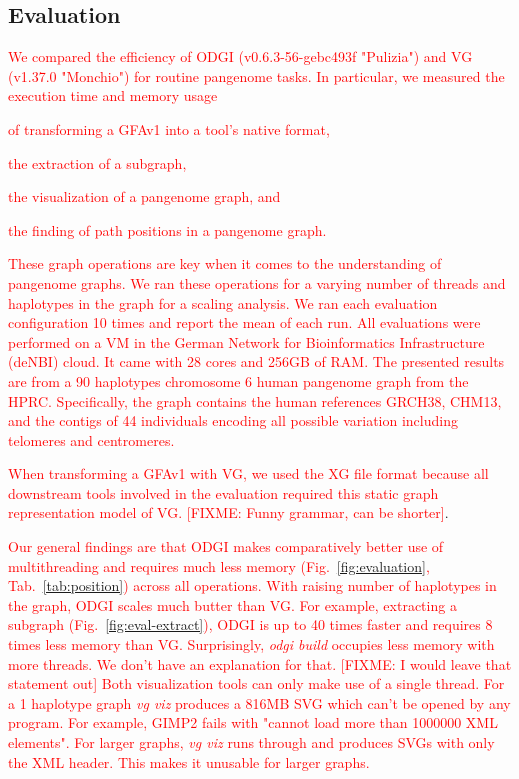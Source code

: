 \documentclass{bioinfo}
\newcommand{\red}[1]{{\textcolor{Red}{#1}}}
\newcommand{\FIXME}[1]{\red{[FIXME: #1]}}
\newcommand{\REVIEWED}[1]{{\textcolor{Red}{#1}}}
\begin{document}
\subsection{Evaluation}
\label{Evaluation}

\REVIEWED{We compared the efficiency of ODGI (v0.6.3-56-gebc493f "Pulizia") and VG (v1.37.0 "Monchio") for routine pangenome tasks. In particular, we measured the execution time and memory usage}
\begin{inparaenum}[(i)]
	\item \REVIEWED{of transforming a GFAv1 into a tool's native format, }
	\item \REVIEWED{the extraction of a subgraph,}
	\item \REVIEWED{the visualization of a pangenome graph, and}
	\item \REVIEWED{the finding of path positions in a pangenome graph.}
\end{inparaenum}
\REVIEWED{These graph operations are key when it comes to the understanding of pangenome graphs. We ran these operations for a varying number of threads and haplotypes in the graph for a scaling analysis. We ran each evaluation configuration 10 times and report the mean of each run.
All evaluations were performed on a VM in the German Network for Bioinformatics Infrastructure (deNBI) cloud. It came with 28 cores and 256GB of RAM.
The presented results are from a 90 haplotypes chromosome 6 human pangenome graph from the HPRC. Specifically, the graph contains the human references GRCH38, CHM13, and the contigs of 44 individuals encoding all possible variation including telomeres and centromeres. }

\REVIEWED{When transforming a GFAv1 with VG, we used the XG file format because all downstream tools involved in the evaluation required this static graph representation model of VG.} \FIXME{Funny grammar, can be shorter}.

\REVIEWED{Our general findings are that ODGI makes comparatively better use of multithreading and requires much less memory (Fig.~\ref{fig:evaluation}, Tab.~\ref{tab:position}) across all operations. With raising number of haplotypes in the graph, ODGI scales much butter than VG. For example, extracting a subgraph (Fig.~\ref{fig:eval-extract}), ODGI is up to 40 times faster and requires 8 times less memory than VG. Surprisingly, \textit{odgi build} occupies less memory with more threads. We don't have an explanation for that.
} \FIXME{I would leave that statement out}
\REVIEWED{Both visualization tools can only make use of a single thread. For a 1 haplotype graph \textit{vg viz} produces a 816MB SVG which can't be opened by any program. For example, GIMP2 fails with "cannot load more than 1000000 XML elements". For larger graphs, \textit{vg viz} runs through and produces SVGs with only the XML header. This makes it unusable for larger graphs.}
\end{document}

